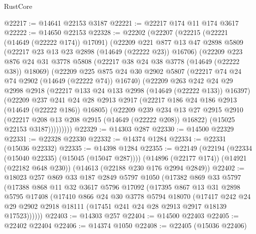 \begin{lexlean}{RustCore}
\begin{coremodule}
@22217 := @14641 @22153 @3187
@22221 := @22217 @174 @11 @174 @3617
@22222 := @14650 @22153
@22328 := @22202
    (@22207
      (@22215
        (@22221 (@14649 (@22222 @174)) @17091)
        (@22209
          @221
          @877
          @13
          @47
          @2898
          @5809
          (@22217 @23 @13 @23 @2898 (@14649 (@22222 @23)) @16706)
          (@22209
            @223
            @876
            @24
            @31
            @3778
            @5808
            (@22217 @38 @24 @38 @3778 (@14649 (@22222 @38)) @18069)
            (@22209
              @225
              @875
              @24
              @30
              @2902
              @5807
              (@22217 @74 @24 @74 @2902 (@14649 (@22222 @74)) @16740)
              (@22209
                @263
                @242
                @24
                @29
                @2998
                @2918
                (@22217 @133 @24 @133 @2998 (@14649 (@22222 @133)) @16397)
                (@22209
                  @237
                  @241
                  @24
                  @28
                  @2913
                  @2917
                  (@22217 @186 @24 @186 @2913 (@14649 (@22222 @186)) @16805)
                  (@22209
                    @239
                    @234
                    @13
                    @27
                    @2915
                    @2910
                    (@22217 @208 @13 @208 @2915 (@14649 (@22222 @208)) @16822)
                    (@15025 @22153 @3187)))))))))
@22329 := @14303 @287
@22330 := @14500 @22329
@22331 := @22328 @22330
@22332 := @14374 @1284
@22334 := @22331 (@15036 @22332)
@22335 := @14398 @1284
@22355 := @22149
    (@22194 (@22334 (@15040 @22335) (@15045 (@15047 @287))))
    (@14896 (@22177 @174))
    (@14921 (@22182 @648 @230))
    (@14613 (@22188 @230 @176 @2994 @2849))
@22402 := @18023
    @257
    @869
    @33
    @187
    @2849
    @5797
    @1050
    (@17382
      @869
      @33
      @5797
      (@17388
        @868
        @11
        @32
        @3617
        @5796
        @17092
        (@17395
          @867
          @13
          @31
          @2898
          @5795
          @17408
          (@17410
            @866
            @24
            @30
            @3778
            @5794
            @18070
            (@17417
              @242
              @24
              @29
              @2902
              @2918
              @18111
              (@17451 @241 @24 @28 @2913 @2917 @18139 @17523))))))
@22403 := @14303 @257
@22404 := @14500 @22403
@22405 := @22402 @22404
@22406 := @14374 @1050
@22408 := @22405 (@15036 @22406)

\end{coremodule}
\end{lexlean}
